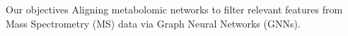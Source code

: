 \documentclass[aspectratio=169]{beamer}
\renewcommand{\alert}[1]{\textbf{\color{swufe}#1}}
\begin{document}
    \begin{frame}{Our objectives}
        Aligning metabolomic networks to filter relevant features from Mass Spectrometry (MS) data via Graph Neural Networks (GNNs). \newline






\end{frame}
\end{document}
